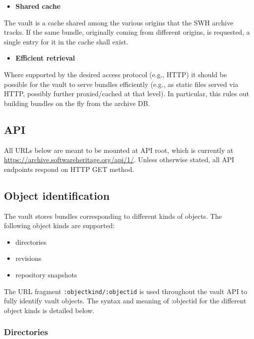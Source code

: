 \begin{itemize}
\itemsep1pt\parskip0pt
\item
  \textbf{Shared cache}
\end{itemize}

The vault is a cache shared among the various origins that the SWH
archive tracks. If the same bundle, originally coming from different
origins, is requested, a single entry for it in the cache shall exist.

\begin{itemize}
\itemsep1pt\parskip0pt
\item
  \textbf{Efficient retrieval}
\end{itemize}

Where supported by the desired access protocol (e.g., HTTP) it should be
possible for the vault to serve bundles efficiently (e.g., as static
files served via HTTP, possibly further proxied/cached at that level).
In particular, this rules out building bundles on the fly from the
archive DB.

\subsection{API}\label{api}

All URLs below are meant to be mounted at API root, which is currently
at \url{https://archive.softwareheritage.org/api/1/}. Unless otherwise
stated, all API endpoints respond on HTTP GET method.

\subsection{Object identification}\label{object-identification}

The vault stores bundles corresponding to different kinds of objects.
The following object kinds are supported:

\begin{itemize}
\itemsep1pt\parskip0pt
\item
  directories
\item
  revisions
\item
  repository snapshots
\end{itemize}

The URL fragment \texttt{:objectkind/:objectid} is used throughout the
vault API to fully identify vault objects. The syntax and meaning of
:objectid for the different object kinds is detailed below.

\subsubsection{Directories}\label{directories}

